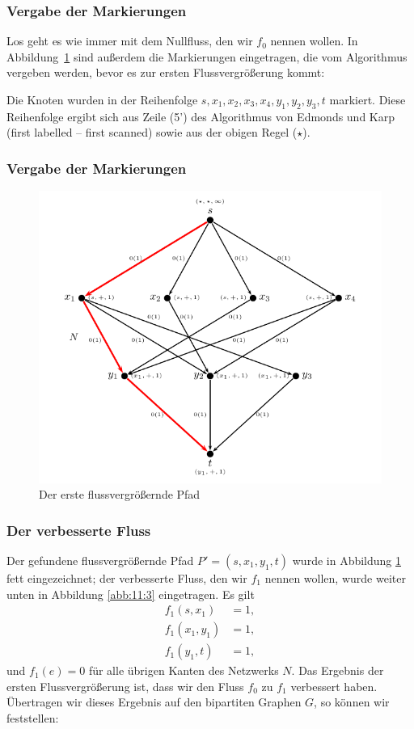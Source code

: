 \documentclass[smaller]{beamer}
\begin{document}
\begin{frame}
 \frametitle{Vergabe der Markierungen}
 Los geht es wie immer mit dem Nullfluss, den wir $f_0$ nennen wollen. In  Abbildung~\ref{abb:11:1} sind außerdem die Markierungen eingetragen, die vom Algorithmus vergeben werden, bevor es zur ersten Flussvergrößerung kommt: \\ \vspace*{0.2cm}
 
 Die Knoten wurden in der Reihenfolge $s,x_1,x_2,x_3,x_4,y_1,y_2,y_3,t$ markiert. Diese Reihenfolge ergibt sich aus Zeile (5') des Algorithmus von Edmonds und Karp ({\glqq}first labelled -- first scanned{\grqq}) sowie aus der obigen Regel ($\star$).
\end{frame}

\begin{frame}
 \frametitle{Vergabe der Markierungen}
 \begin{figure}
 \begin{center}
  \includegraphics[scale = 0.72]{fig49.pdf}
 \end{center}
 \caption{Der erste flussvergrößernde Pfad}
 \label{abb:11:1}
 \end{figure}
\end{frame}

\begin{frame}
 \frametitle{Der verbesserte Fluss}
 Der gefundene flussvergrößernde Pfad $P'=(s,x_1,y_1,t)$ wurde in Abbildung \ref{abb:11:1} fett eingezeichnet; der verbesserte Fluss, den wir $f_1$ nennen wollen, wurde weiter unten in Abbildung \ref{abb:11:3} eingetragen. Es gilt
\begin{align*}
f_1(s,x_1) &= 1, \\
f_1(x_1,y_1) &= 1, \\
f_1(y_1,t) &= 1,
\end{align*}
und $f_1(e)=0$ für alle übrigen Kanten des Netzwerks $N$. Das Ergebnis der ersten Flussvergrößerung ist, dass wir den Fluss $f_0$ zu $f_1$ verbessert haben. Übertragen wir dieses Ergebnis auf den bipartiten Graphen $G$, so können wir feststellen: 
\end{frame}
\end{document}
